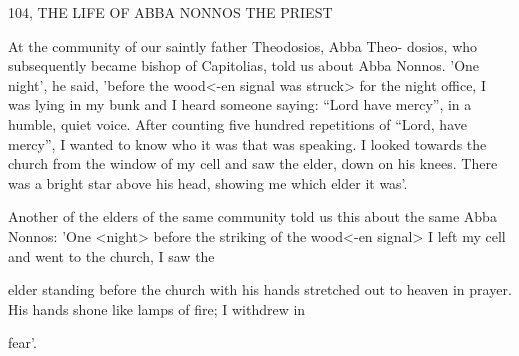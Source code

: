 104, THE LIFE OF ABBA NONNOS THE PRIEST

At the community of our saintly father Theodosios, Abba Theo-
dosios, who subsequently became bishop of Capitolias, told us
about Abba Nonnos. 'One night', he said, 'before the wood<-en
signal was struck> for the night office, I was lying in my bunk and
I heard someone saying: “Lord have mercy”, in a humble, quiet
voice. After counting five hundred repetitions of “Lord, have
mercy”, I wanted to know who it was that was speaking. I looked
towards the church from the window of my cell and saw the elder,
down on his knees. There was a bright star above his head, showing
me which elder it was'.

Another of the elders of the same community told us this about
the same Abba Nonnos: 'One <night> before the striking of the
wood<-en signal> I left my cell and went to the church, I saw the

elder standing before the church with his hands stretched out to
heaven in prayer. His hands shone like lamps of fire; I withdrew in

fear'.

